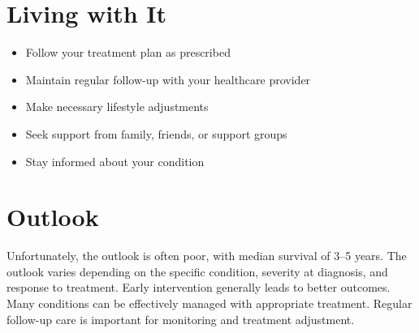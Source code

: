 \section{Living with It}
\begin{itemize}[noitemsep]
  \item Follow your treatment plan as prescribed
  \item Maintain regular follow-up with your healthcare provider
  \item Make necessary lifestyle adjustments
  \item Seek support from family, friends, or support groups
  \item Stay informed about your condition
\end{itemize}
\section{Outlook}
Unfortunately, the outlook is often poor, with median survival of 3--5 years. The outlook varies depending on the specific condition, severity at diagnosis, and response to treatment. Early intervention generally leads to better outcomes. Many conditions can be effectively managed with appropriate treatment. Regular follow-up care is important for monitoring and treatment adjustment.
